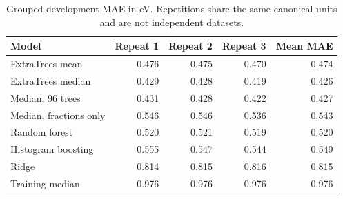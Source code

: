 \begin{table}[htbp]\centering\small
\caption{Grouped development MAE in eV. Repetitions share the same canonical units and are not independent datasets.}
\begin{tabular}{lrrrr}
\toprule
Model & Repeat 1 & Repeat 2 & Repeat 3 & Mean MAE \\
\midrule
ExtraTrees mean & 0.476 & 0.475 & 0.470 & 0.474 \\
ExtraTrees median & 0.429 & 0.428 & 0.419 & 0.426 \\
Median, 96 trees & 0.431 & 0.428 & 0.422 & 0.427 \\
Median, fractions only & 0.546 & 0.546 & 0.536 & 0.543 \\
Random forest & 0.520 & 0.521 & 0.519 & 0.520 \\
Histogram boosting & 0.555 & 0.547 & 0.544 & 0.549 \\
Ridge & 0.814 & 0.815 & 0.816 & 0.815 \\
Training median & 0.976 & 0.976 & 0.976 & 0.976 \\
\bottomrule
\end{tabular}\end{table}
